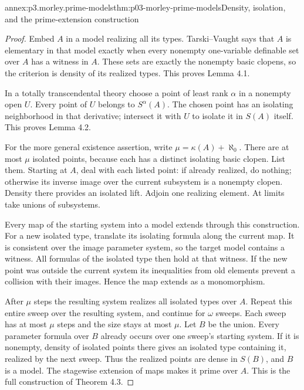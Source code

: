 \begin{annexitem}{annex:p3.morley.prime-models}{thm:p03-morley-prime-models}{Density, isolation, and the prime-extension construction}
\begin{proof}
Embed \(A\) in a model realizing all its types.
Tarski--Vaught says that \(A\) is elementary
in that model exactly when every nonempty
one-variable definable set over \(A\)
has a witness in \(A\). These sets are
exactly the nonempty basic clopens, so
the criterion is density of its realized
types. This proves Lemma 4.1.

In a totally transcendental theory choose
a point of least rank \(\alpha\) in a
nonempty open \(U\). Every point of
\(U\) belongs to \(S^\alpha(A)\).
The chosen point has an isolating
neighborhood in that derivative; intersect
it with \(U\) to isolate it in \(S(A)\)
itself. This proves Lemma 4.2.

For the more general existence assertion,
write \(\mu=\kappa(A)+\aleph_0\).
There are at most \(\mu\) isolated
points, because each has a distinct
isolating basic clopen. List them.
Starting at \(A\), deal with each
listed point: if already realized,
do nothing; otherwise its inverse
image over the current subsystem is
a nonempty clopen. Density there
provides an isolated lift. Adjoin
one realizing element. At limits
take unions of subsystems.

Every map of the starting system
into a model extends through this
construction. For a new isolated
type, translate its isolating formula
along the current map. It is consistent
over the image parameter system, so
the target model contains a witness.
All formulas of the isolated type
then hold at that witness. If the
new point was outside the current
system its inequalities from old
elements prevent a collision with
their images. Hence the map extends
as a monomorphism.

After \(\mu\) steps the resulting
system realizes all isolated types
over \(A\). Repeat this entire sweep
over the resulting system, and
continue for \(\omega\) sweeps.
Each sweep has at most \(\mu\)
steps and the size stays at most
\(\mu\). Let \(B\) be the union.
Every parameter formula over \(B\)
already occurs over one sweep's
starting system. If it is nonempty,
density of isolated points there
gives an isolated type containing it,
realized by the next sweep. Thus
the realized points are dense in
\(S(B)\), and \(B\) is a model.
The stagewise extension of maps
makes it prime over \(A\).
This is the full construction of
Theorem 4.3.
\end{proof}
\end{annexitem}

